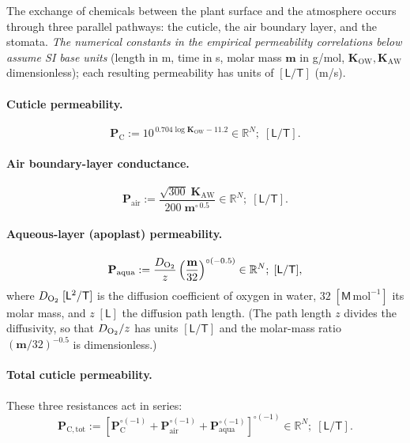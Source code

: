 \documentclass[12pt,a4paper]{article}
\newcommand{\R}{\mathbb{R}}
\newcommand{\dM}{\mathsf{M}}
\newcommand{\dL}{\mathsf{L}}
\newcommand{\dT}{\mathsf{T}}
\begin{document}
The exchange of chemicals between the plant surface and the atmosphere occurs through three parallel pathways: the cuticle, the air boundary layer, and the stomata.  \emph{The numerical constants in the empirical permeability correlations below assume SI base units} (length in \si{m}, time in \si{s}, molar mass $\mathbf m$ in \si{g/mol}, $\mathbf K_\mathrm{OW},\mathbf K_\mathrm{AW}$ dimensionless); each resulting permeability has units of $[\dL/\dT]$ (\si{m/s}).

\paragraph{Cuticle permeability.}
\begin{equation}\label{eq:Pc}
    \mathbf{P}_\mathrm{C} := 10^{\,0.704\log \mathbf{K}_\mathrm{OW}-11.2}\in \R^{N};\; [\dL/\dT].
\end{equation}

\paragraph{Air boundary-layer conductance.}
\begin{equation}\label{eq:Pair}
    \mathbf{P}_\mathrm{air} := \frac{\sqrt{300}\;\mathbf{K}_\mathrm{AW}}{200\;\mathbf{m}^{\circ\,0.5}}\in \R^{N};\; [\dL/\dT].
\end{equation}

\paragraph{Aqueous-layer (apoplast) permeability.}
\begin{equation}\label{eq:Paqua}
    \mathbf{P}_\mathrm{aqua} := \frac{D_{\ce{O2}}}{z}\left(\frac{\mathbf{m}}{32}\right)^{\circ(-0.5)}\in \R^{N};\; [\dL/\dT],
\end{equation}
where $D_{\ce{O2}}\;[\dL^2/\dT]$ is the diffusion coefficient of oxygen in water, $32\;[\dM\,\mathrm{mol}^{-1}]$ its molar mass, and $z\;[\dL]$ the diffusion path length.  (The path length $z$ divides the diffusivity, so that $D_{\ce{O2}}/z$ has units $[\dL/\dT]$ and the molar-mass ratio $(\mathbf m/32)^{-0.5}$ is dimensionless.)

\paragraph{Total cuticle permeability.}  These three resistances act in series:
\begin{equation}\label{eq:Pctot}
    \mathbf{P}_\mathrm{C, tot} := \left[\mathbf{P}_\mathrm{C}^{\circ(-1)} + \mathbf{P}_\mathrm{air}^{\circ(-1)} +  \mathbf{P}_\mathrm{aqua}^{\circ(-1)}\right]^{\circ(-1)}\in \R^{N};\; [\dL/\dT].
\end{equation}
\end{document}
